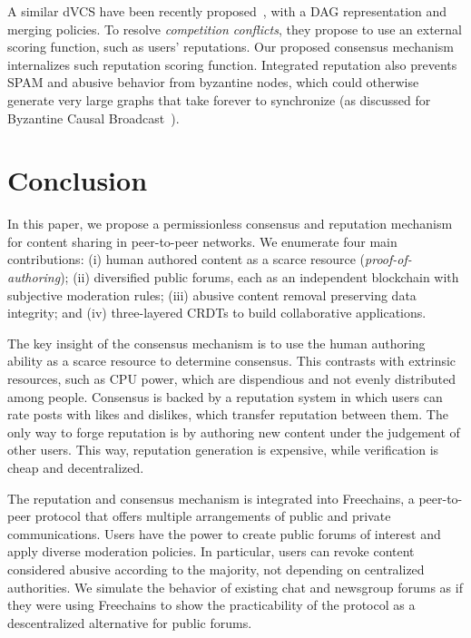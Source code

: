 \documentclass[10pt,journal,compsoc]{IEEEtran}
\newcommand{\FC}       {Freechains\xspace}
\begin{document}
A similar dVCS have been recently proposed~\cite{p2p.dvcs}, with a DAG
representation and merging policies.
To resolve \emph{competition conflicts}, they propose to use an external
scoring function, such as users' reputations.
Our proposed consensus mechanism internalizes such reputation scoring function.
Integrated reputation also prevents SPAM and abusive behavior from byzantine
nodes, which could otherwise generate very large graphs that take forever to
synchronize (as discussed for Byzantine Causal Broadcast~\cite{p2p.dag.sync}).

\section{Conclusion}
\label{sec.conclusion}

In this paper, we propose a permissionless consensus and reputation mechanism
for content sharing in peer-to-peer networks.
We enumerate four main contributions:
    (i)   human authored content as a scarce resource
          (\emph{proof-of-authoring});
    (ii)  diversified public forums, each as an independent blockchain with
          subjective moderation rules;
    (iii) abusive content removal preserving data integrity; and
    (iv)  three-layered CRDTs to build collaborative applications.

The key insight of the consensus mechanism is to use the human authoring
ability as a scarce resource to determine consensus.
This contrasts with extrinsic resources, such as CPU power, which are
dispendious and not evenly distributed among people.
%
Consensus is backed by a reputation system in which users can rate posts with
likes and dislikes, which transfer reputation between them.
The only way to forge reputation is by authoring new content under the
judgement of other users.
This way, reputation generation is expensive, while verification is cheap and
decentralized.

The reputation and consensus mechanism is integrated into \FC, a peer-to-peer
protocol that offers multiple arrangements of public and private
communications.
Users have the power to create public forums of interest and apply diverse
moderation policies.
In particular, users can revoke content considered abusive according to the
majority, not depending on centralized authorities.
%
We simulate the behavior of existing chat and newsgroup forums as if they were
using \FC to show the practicability of the protocol as a descentralized
alternative for public forums.

\end{document}
